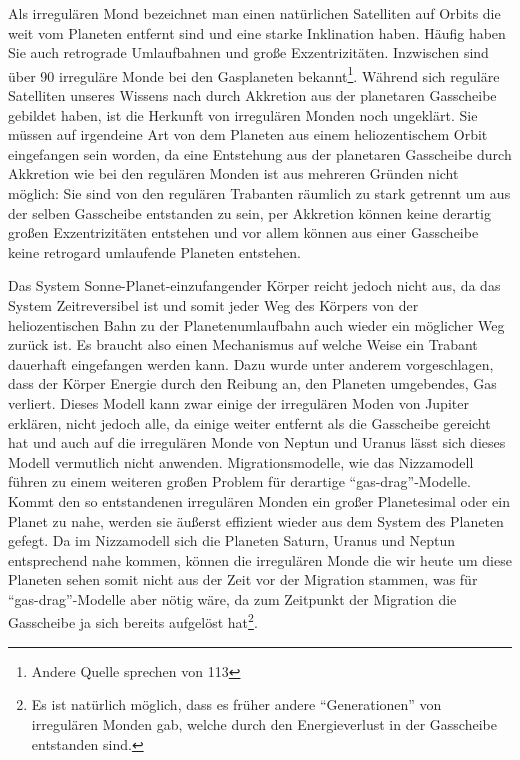 \documentclass[10pt,a4paper,twoside]{article}
\begin{document}
Als irregulären Mond bezeichnet man einen natürlichen Satelliten auf Orbits die weit vom Planeten entfernt sind und eine starke Inklination haben\cite{Nesvorny2007}. %
Häufig haben Sie auch retrograde Umlaufbahnen und große Exzentrizitäten\cite{Nesvorny2007}.
Inzwischen sind über 90 irreguläre Monde bei den Gasplaneten bekannt\cite{Nesvorny2007}\footnote{Andere Quelle sprechen von 113}. %
Während sich reguläre Satelliten unseres Wissens nach durch Akkretion aus der planetaren Gasscheibe gebildet haben, ist die Herkunft von irregulären Monden noch ungeklärt.
Sie müssen auf irgendeine Art von dem Planeten aus einem heliozentischem Orbit eingefangen sein worden, da eine Entstehung aus der planetaren Gasscheibe durch Akkretion wie bei den regulären Monden ist aus mehreren Gründen nicht möglich:
Sie sind von den regulären Trabanten räumlich zu stark getrennt um aus der selben Gasscheibe entstanden zu sein, per Akkretion können keine derartig großen Exzentrizitäten entstehen und vor allem können aus einer Gasscheibe keine retrogard umlaufende Planeten entstehen\cite{Nesvorny2007}. %

Das System Sonne-Planet-einzufangender Körper reicht jedoch nicht aus, da das System Zeitreversibel ist und somit jeder Weg des Körpers von der heliozentischen Bahn zu der Planetenumlaufbahn auch wieder ein möglicher Weg zurück ist\cite{Nesvorny2007}. %
Es braucht also einen Mechanismus auf welche Weise ein Trabant dauerhaft eingefangen werden kann. Dazu wurde unter anderem vorgeschlagen, dass der Körper Energie durch den Reibung an, den Planeten umgebendes, Gas verliert. %
Dieses Modell kann zwar einige der irregulären Moden von Jupiter erklären, nicht jedoch alle, da einige weiter entfernt als die Gasscheibe gereicht hat und auch auf die irregulären Monde von Neptun und Uranus lässt sich dieses Modell vermutlich nicht anwenden\cite{Nesvorny2007}. %
Migrationsmodelle, wie das Nizzamodell führen zu einem weiteren großen Problem für derartige "`gas-drag"'-Modelle. Kommt den so entstandenen irregulären Monden ein großer Planetesimal oder ein Planet zu nahe, werden sie äußerst effizient wieder aus dem System des Planeten gefegt\cite{Nesvorny2007}. Da im Nizzamodell sich die Planeten Saturn, Uranus und Neptun entsprechend nahe kommen, können die irregulären Monde die wir heute um diese Planeten sehen somit nicht aus der Zeit vor der Migration stammen\cite{Tsiganis2005}\cite{Nesvorny2007}, was für "`gas-drag"'-Modelle aber nötig wäre, da zum Zeitpunkt der Migration die Gasscheibe ja sich bereits aufgelöst hat\footnote{Es ist natürlich möglich, dass es früher andere "`Generationen"' von irregulären Monden gab, welche durch den Energieverlust in der Gasscheibe entstanden sind. }. %
\end{document}
